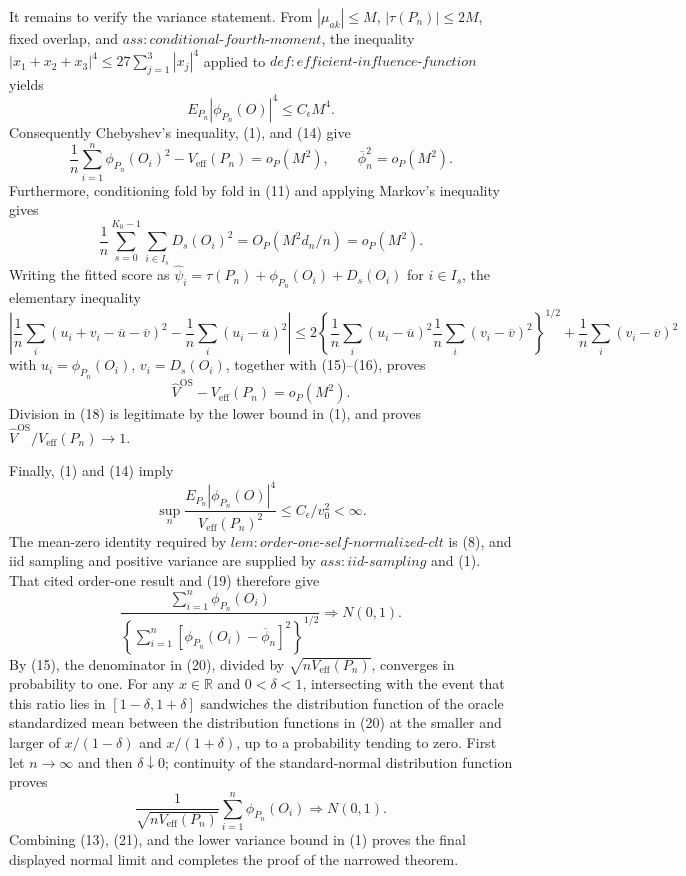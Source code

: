 It remains to verify the variance statement.  From
\(|\mu_{ak}|\le M\), \(|\tau(P_n)|\le2M\), fixed overlap, and
\(ass:conditional\text{-}fourth\text{-}moment\), the inequality
\(|x_1+x_2+x_3|^4\le27\sum_{j=1}^3|x_j|^4\) applied to
\(def:efficient\text{-}influence\text{-}function\) yields
\[
 E_{P_n}|\phi_{P_n}(O)|^4\le C_\epsilon M^4.
\tag{14}
\]
Consequently Chebyshev's inequality, (1), and (14) give
\[
 \frac1n\sum_{i=1}^n\phi_{P_n}(O_i)^2
   -V_{\mathrm{eff}}(P_n)=o_P(M^2),
 \qquad
 \overline\phi_n^2=o_P(M^2).
\tag{15}
\]
Furthermore, conditioning fold by fold in (11) and applying Markov's
inequality gives
\[
 \frac1n\sum_{s=0}^{K_0-1}\sum_{i\in I_s}D_s(O_i)^2
 =O_P(M^2d_n/n)=o_P(M^2).
\tag{16}
\]
Writing the fitted score as
\(\widehat\psi_i=\tau(P_n)+\phi_{P_n}(O_i)+D_s(O_i)\) for
\(i\in I_s\), the elementary inequality
\[
 \left|\frac1n\sum_i(u_i+v_i-\overline u-\overline v)^2
       -\frac1n\sum_i(u_i-\overline u)^2\right|
 \le2\left\{\frac1n\sum_i(u_i-\overline u)^2
             \frac1n\sum_i(v_i-\overline v)^2\right\}^{1/2}
      +\frac1n\sum_i(v_i-\overline v)^2
\tag{17}
\]
with \(u_i=\phi_{P_n}(O_i)\), \(v_i=D_s(O_i)\), together with
(15)--(16), proves
\[
 \widehat V^{\mathrm{OS}}-V_{\mathrm{eff}}(P_n)=o_P(M^2).
\tag{18}
\]
Division in (18) is legitimate by the lower bound in (1), and proves
\(\widehat V^{\mathrm{OS}}/V_{\mathrm{eff}}(P_n)\to1\).

Finally, (1) and (14) imply
\[
 \sup_n\frac{E_{P_n}|\phi_{P_n}(O)|^4}
                 {V_{\mathrm{eff}}(P_n)^2}
 \le C_\epsilon/v_0^2<\infty.
\tag{19}
\]
The mean-zero identity required by
\(lem:order\text{-}one\text{-}self\text{-}normalized\text{-}clt\) is (8),
and iid sampling and positive variance are supplied by
\(ass:iid\text{-}sampling\) and (1).  That cited order-one result and (19)
therefore give
\[
 \frac{\sum_{i=1}^n\phi_{P_n}(O_i)}
 {\left\{\sum_{i=1}^n[\phi_{P_n}(O_i)-\overline\phi_n]^2\right\}^{1/2}}
 \Rightarrow N(0,1).
\tag{20}
\]
By (15), the denominator in (20), divided by
\(\sqrt{nV_{\mathrm{eff}}(P_n)}\), converges in probability to one.  For any
\(x\in\mathbb R\) and \(0<\delta<1\), intersecting with the event that this
ratio lies in \([1-\delta,1+\delta]\) sandwiches the distribution function of
the oracle standardized mean between the distribution functions in (20) at
the smaller and larger of \(x/(1-\delta)\) and \(x/(1+\delta)\), up to a
probability tending to zero.
First let \(n\to\infty\) and then \(\delta\downarrow0\); continuity of the
standard-normal distribution function proves
\[
 \frac{1}{\sqrt{nV_{\mathrm{eff}}(P_n)}}
 \sum_{i=1}^n\phi_{P_n}(O_i)\Rightarrow N(0,1).
\tag{21}
\]
Combining (13), (21), and the lower variance bound in (1) proves the final
displayed normal limit and completes the proof of the narrowed theorem.


